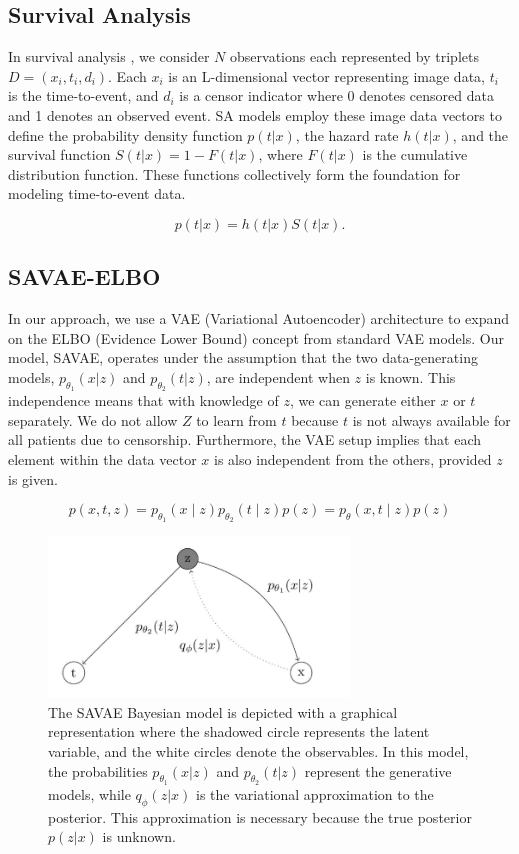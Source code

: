 \documentclass{article}
\begin{document}
\subsection{Survival Analysis}
In survival analysis \cite{clark2003survival}, we consider \(N\) observations each represented by triplets \(D = (x_i, t_i, d_i)\). Each \(x_i\) is an L-dimensional vector representing image data, \(t_i\) is the time-to-event, and \(d_i\) is a censor indicator where 0 denotes censored data and 1 denotes an observed event. SA models employ these image data vectors to define the probability density function \(p(t|x)\), the hazard rate \(h(t|x)\), and the survival function \(S(t|x) = 1 - F(t|x)\), where \(F(t|x)\) is the cumulative distribution function. These functions collectively form the foundation for modeling time-to-event data.

\begin{equation}
p(t|x) = h(t|x)S(t|x).
\end{equation}

\subsection{SAVAE-ELBO}
In our approach, we use a VAE (Variational Autoencoder) architecture to expand on the ELBO (Evidence Lower Bound) concept from standard VAE models. Our model, SAVAE, operates under the assumption that the two data-generating models,  \( p_{\theta_1} (x|z) \) and \( p_{\theta_2} (t|z) \),  are independent when \( z \) is known. This independence means that with knowledge of \( z \), we can generate either \( x \) or \( t \) separately. We do not allow \( Z \) to learn from \( t \) because \( t \) is not always available for all patients due to censorship. Furthermore, the VAE setup implies that each element within the data vector \( x \) is also independent from the others, provided \( z \) is given.

\begin{equation}
    p(x, t, z) = p_{\theta_1}(x \mid z) p_{\theta_2}(t \mid z) p(z) = p_{\theta}(x, t \mid z) p(z) 
\end{equation}

\begin{figure}[H]
    \centering
    \includegraphics[width=8cm]{figures/SAVAE.png}
    \caption{The SAVAE Bayesian model is depicted with a graphical representation where the shadowed circle represents the latent variable, and the white circles denote the observables. In this model, the probabilities \(p_{\theta_1}(x|z)\) and \(p_{\theta_2}(t|z)\) represent the generative models, while \(q_\phi(z|x)\) is the variational approximation to the posterior. This approximation is necessary because the true posterior \(p(z|x)\) is unknown.
}
    \label{SAVAE}
\end{figure}
\end{document}
